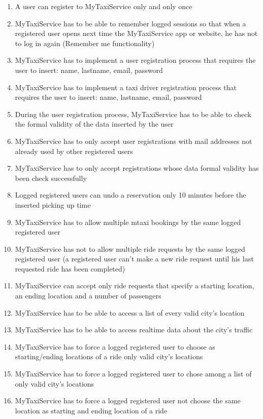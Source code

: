 \documentclass[11pt,titlepage]{article} %
\begin{document}
\begin{enumerate}
	      \item A user can register to MyTaxiService only and only once
	      \item MyTaxiService has to be able to remember logged sessions so that when a registered user
	      opens next time the MyTaxiService app or website, he has not to log in again (Remember me functionality)
	      \item MyTaxiService has to implement a user registration process that requires the user to insert: name, lastname,
	      email, password
	      \item MyTaxiService has to implement a taxi driver registration process that requires the user to insert: name, lastname,
	      email, password
	      \item During the user registration process, MyTaxiService has to be able to check the formal validity of the
	      data inserted by the user
	      \item MyTaxiService has to only accept user registrations with mail addresses not already used by other
	      registered users
	      \item MyTaxiService has to only accept registrations whose data formal validity has been
	      check successfully
	      \item Logged registered users can undo a reservation only 10 minutes before the inserted
	      picking up time
	      \item MyTaxiService has to allow multiple mtaxi bookings by the same logged registered user
	      \item MyTaxiService has not to allow multiple ride requests by the same logged registered user
	      (a registered user can't make a new ride request until his last requested ride has been completed)
	      \item MyTaxiService can accept only ride requests that specify a starting location, an ending location
	      and a number of passengers
	      \item MyTaxiService has to be able to access a list of every valid city's location
	      \item MyTaxiService has to be able to access realtime data about the city's traffic
	      \item MyTaxiService has to force a logged registered user to choose as starting/ending locations of a ride only valid city's locations
	      \item MyTaxiService has to force a logged registered user to chose among a list of only valid city's locations
	      \item MyTaxiService has to force a logged registered user not choose the same location as starting and ending location of a ride

\end{enumerate}
\end{document}
